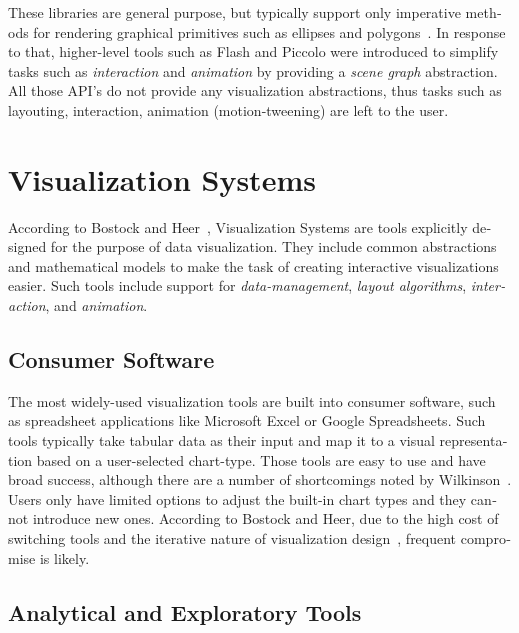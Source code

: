 \begin{english}
These libraries are general purpose, but typically support only imperative methods for rendering graphical primitives such as ellipses and polygons~\cite{Protovis09}. In response to that, higher-level tools such as Flash and Piccolo were introduced to simplify tasks such as \emph{interaction} and \emph{animation} by providing a \emph{scene graph} abstraction. All those API's do not provide any visualization abstractions, thus tasks such as layouting, interaction, animation (motion-tweening) are left to the user.


\section{Visualization Systems}

According to Bostock and Heer~\cite{Protovis09}, Visualization Systems are tools explicitly designed for the purpose of data visualization. They include common abstractions and mathematical models to make the task of creating interactive visualizations easier. Such tools include support for \emph{data-management}, \emph{layout algorithms}, \emph{interaction}, and \emph{animation}.


\subsection{Consumer Software}

The most widely-used visualization tools are built into consumer software, such as spreadsheet applications like Microsoft Excel or Google Spreadsheets. Such tools typically take tabular data as their input and map it to a visual representation based on a user-selected chart-type. Those tools are easy to use and have broad success, although there are a number of shortcomings noted by Wilkinson~\cite{wilkinson2005grammar}.
Users only have limited options to adjust the built-in chart types and they cannot introduce new ones. According to Bostock and Heer, due to the high cost of switching tools and the iterative nature of visualization design~\cite{card99}, frequent compromise is likely.

\subsection{Analytical and Exploratory Tools}


\end{english}
